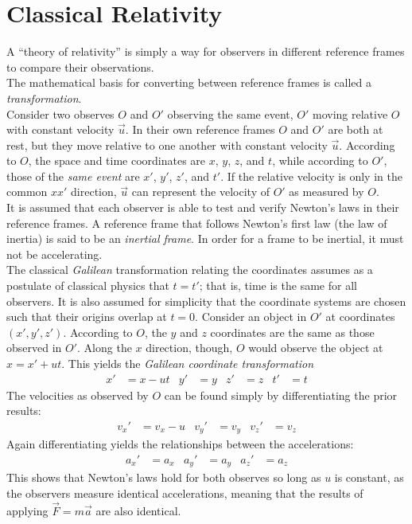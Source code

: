 \documentclass{subfiles}
\begin{document}
	\section{Classical Relativity}
		A \enquote{theory of relativity} is simply a way for observers in different reference frames to compare their observations. \\
		The mathematical basis for converting between reference frames is called a \textit{transformation}. \\
		Consider two observes \(O\) and \(O'\) observing the same event, \(O'\) moving relative \(O\) with constant velocity \(\vec{u}\). In their own reference frames \(O\) and \(O'\) are both at rest, but they move relative to one another with constant velocity \(\vec{u}\). According to \(O\), the space and time coordinates are \(x\), \(y\), \(z\), and \(t\), while according to \(O'\), those of the \textit{same event} are \(x'\), \(y'\), \(z'\), and \(t'\). If the relative velocity is only in the common \(xx'\) direction, \(\vec{u}\) can represent the velocity of \(O'\) as measured by \(O\). \\
		It is assumed that each observer is able to test and verify Newton's laws in their reference frames. A reference frame that follows Newton's first law (the law of inertia) is said to be an \textit{inertial frame}. In order for a frame to be inertial, it must not be accelerating. \\
		The classical \textit{Galilean} transformation relating the coordinates assumes as a postulate of classical physics that \(t = t'\); that is, time is the same for all observers. It is also assumed for simplicity that the coordinate systems are chosen such that their origins overlap at \(t = 0\). Consider an object in \(O'\) at coordinates \((x', y', z')\). According to \(O\), the \(y\) and \(z\) coordinates are the same as those observed in \(O'\). Along the \(x\) direction, though, \(O\) would observe the object at \(x = x' + ut\). This yields the \textit{Galilean coordinate transformation}
			\begin{align*}
				x' &= x - ut &
					y' &= y &
					z' &= z &
					t' &= t
						\tag{Galilean coordinate transformation}	
			\end{align*}
			The velocities as observed by \(O\) can be found simply by differentiating the prior results:
			\begin{align*}
				v_x' &= v_x - u &
					v_y' &= v_y &
					v_z' &= v_z	
						\tag{Galilean velocity transformation}
			\end{align*}
			Again differentiating yields the relationships between the accelerations:
			\begin{align*}
				a_x' &= a_x &
					a_y' &= a_y &	
					a_z' &= a_z
			\end{align*}
			This shows that Newton's laws hold for both observes so long as \(u\) is constant, as the observers measure identical accelerations, meaning that the results of applying \(\vec{F} = m\vec{a}\) are also identical.
	\setcounter{section}{2}
\end{document}
